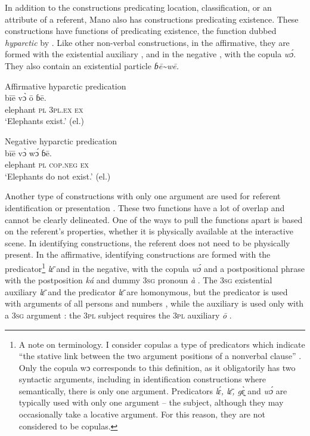 \documentclass[output=paper,colorlinks,citecolor=brown]{langscibook}
\begin{document}
In addition to the constructions predicating location, classification, or an attribute of a referent, Mano also has constructions predicating existence. These constructions have functions of predicating existence, the function dubbed \textit{hyparctic} by \citet{Haspelmath2021}. Like other non-verbal constructions, in the affirmative, they are formed with the existential auxiliary , and in the negative , with the copula \textit{wɔ́}. They also contain an existential particle \textit{ɓē{\textasciitilde}wē.}


\ea\label{ex:mano:38}Affirmative hyparctic predication\\
    \gll bīē vɔ̀ ō ɓē.    \\
         elephant \textsc{pl} \textsc{3pl.ex} \textsc{ex}    \\
    \glt \textsc{‘}Elephants exist.’ (el.)
\z

\ea\label{ex:mano:39}Negative hyparctic predication\\
    \gll bīē vɔ̀ wɔ́ ɓē.    \\
         elephant \textsc{pl} \textsc{cop.neg} \textsc{ex}    \\
    \glt ‘Elephants do not exist.’ (el.)
\z

Another type of constructions with only one argument are used for referent identification or presentation \citep{Killian2022}. These two functions have a lot of overlap and cannot be clearly delineated. One of the ways to pull the functions apart is based on the referent’s properties, whether it is physically available at the interactive scene. In identifying constructions, the referent does not need to be physically present. In the affirmative, identifying constructions are formed with the predicator\footnote{A note on terminology. I consider copulas a type of predicators which indicate “the stative link between the two argument positions of a nonverbal clause” \citep[9]{Haspelmath2021}. Only the copula wɔ corresponds to this definition, as it obligatorily has two syntactic arguments, including in identification constructions where semantically, there is only one argument. Predicators \textit{lɛ́, lɛ̄, gɛ̰̀} and \textit{wɔ́} are typically used with only one argument -- the subject, although they may occasionally take a locative argument. For this reason, they are not considered to be copulas.} \textit{lɛ̄ }  and in the negative, with the copula \textit{wɔ́} and a postpositional phrase with the postposition \textit{ká} and dummy 3\textsc{sg} pronoun \textit{à} . The 3\textsc{sg} existential auxiliary \textit{lɛ̄ } and the predicator \textit{lɛ̄ } are homonymous, but the predicator is used with arguments of all persons and numbers , while the auxiliary is used only with a \textsc{3sg} argument : the \textsc{3pl} subject requires the \textsc{3pl} auxiliary \textit{ō} . 
\end{document}
